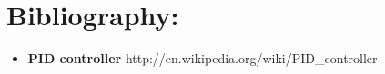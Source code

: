 \documentclass{llncs}
\newcommand{\labelsec}[1]{\label{sec:#1}}
\begin{document}
\section{Bibliography:}
\labelsec{Biblio}
\begin{itemize}
	\item \textbf{PID controller} http://en.wikipedia.org/wiki/PID\_controller
\end{itemize}
\appendix

 
\appendix
\end{document}

